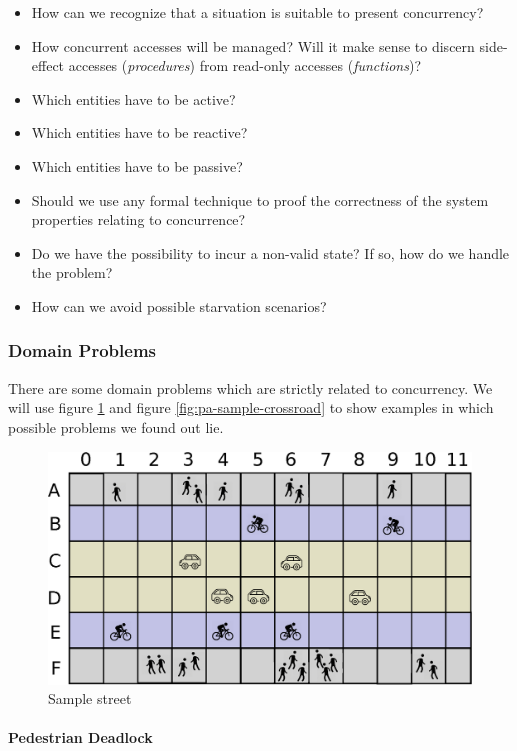 \begin{itemize}
\item How can we recognize that a situation is suitable to present concurrency?
\item How concurrent accesses will be managed? Will it make sense to discern
  side-effect accesses (\emph{procedures}) from read-only accesses
  (\emph{functions})?
\item Which entities have to be active?
\item Which entities have to be reactive?
\item Which entities have to be passive?
\item Should we use any formal technique to proof the correctness 
of the system properties relating to concurrence?
\item Do we have the possibility to incur a non-valid state? If so, how do we
  handle the problem?
\item How can we avoid possible starvation scenarios?
\end{itemize}

\subsubsection{Domain Problems}\label{sec:pa-domain-problems}

There are some domain problems which are strictly related to concurrency.
We will use figure \ref{fig:pa-sample-street} and figure
\ref{fig:pa-sample-crossroad} to show examples in which possible problems we
found out lie.

\begin{figure}[H]
  \centering
  \includegraphics[width=.7\columnwidth]{images/analysis/street_base.eps}
  \caption{Sample street}
  \label{fig:pa-sample-street}
\end{figure}

\paragraph{Pedestrian Deadlock} \mbox{} \\

